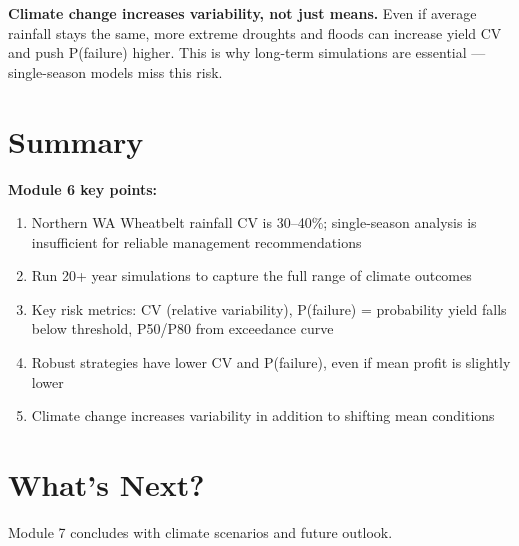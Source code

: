 \begin{warningbox}
\textbf{Climate change increases variability, not just means.} Even if average rainfall stays the same, more extreme droughts and floods can increase yield CV and push P(failure) higher. This is why long-term simulations are essential --- single-season models miss this risk.
\end{warningbox}

\section{Summary}

\begin{keyconceptbox}
\textbf{Module 6 key points:}
\begin{enumerate}
  \item Northern WA Wheatbelt rainfall CV is 30--40\%; single-season analysis is insufficient for reliable management recommendations
  \item Run 20+ year simulations to capture the full range of climate outcomes
  \item Key risk metrics: CV (relative variability), P(failure) = probability yield falls below threshold, P50/P80 from exceedance curve
  \item Robust strategies have lower CV and P(failure), even if mean profit is slightly lower
  \item Climate change increases variability in addition to shifting mean conditions
\end{enumerate}
\end{keyconceptbox}

\section{What's Next?}

Module 7 concludes with climate scenarios and future outlook.

